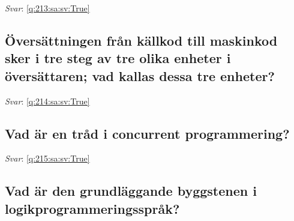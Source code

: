 \documentclass[a4paper,11pt,oneside]{article}
\begin{document}
\begin{sloppypar}
\label{q:213:sa:sv:False}

\vspace{2cm}

\noindent\makebox[\textwidth]{\hrulefill}

\vspace{1cm}

\textit{Svar}: \autoref{q:213:sa:sv:True}



\subsection{\"Overs\"attningen fr\r{a}n k\"allkod till maskinkod sker i tre steg av tre olika enheter i \"overs\"attaren; vad kallas dessa tre enheter?}

\label{q:214:sa:sv:False}

\vspace{2cm}

\noindent\makebox[\textwidth]{\hrulefill}

\vspace{1cm}

\textit{Svar}: \autoref{q:214:sa:sv:True}



\subsection{Vad \"ar en tr\r{a}d i concurrent programmering?}

\label{q:215:sa:sv:False}

\vspace{2cm}

\noindent\makebox[\textwidth]{\hrulefill}

\vspace{1cm}

\textit{Svar}: \autoref{q:215:sa:sv:True}



\subsection{Vad \"ar den grundl\"aggande byggstenen i logikprogrammeringsspr\r{a}k?}

\label{q:216:sa:sv:False}

\vspace{2cm}

\noindent\makebox[\textwidth]{\hrulefill}

\vspace{1cm}


\end{sloppypar}
\end{document}
